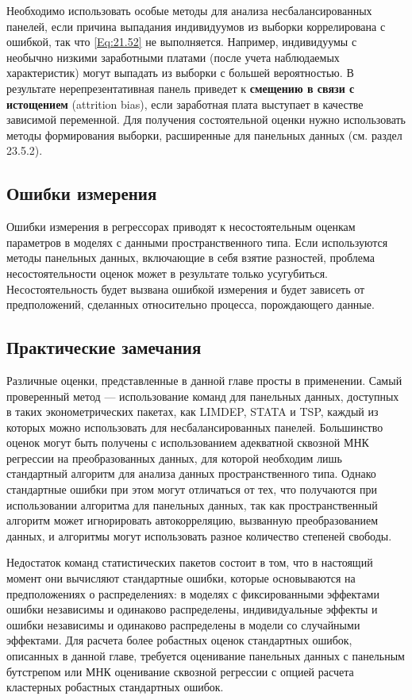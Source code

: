 Необходимо использовать особые методы для анализа несбалансированных панелей, если причина выпадания индивидуумов из выборки коррелирована с ошибкой, так что \ref{Eq:21.52} не выполняется. Например, индивидуумы с необычно низкими заработными платами (после учета наблюдаемых характеристик) могут выпадать из выборки с большей вероятностью. В результате нерепрезентативная панель приведет к \textbf{смещению в связи с истощением} (attrition bias), если заработная плата выступает в качестве зависимой переменной. Для получения состоятельной оценки нужно использовать методы формирования выборки, расширенные для панельных данных (см. раздел 23.5.2).

\subsection{Ошибки измерения}

Ошибки измерения в регрессорах приводят к несостоятельным оценкам параметров в моделях с данными пространственного типа. Если используются методы панельных данных, включающие в себя взятие разностей, проблема несостоятельности оценок может в результате только усугубиться.  Несостоятельность будет  вызвана ошибкой измерения и будет зависеть от предположений, сделанных относительно процесса, порождающего данные.

\subsection{Практические замечания}

Различные оценки, представленные в данной главе просты в применении. Самый проверенный метод --- использование команд для панельных данных, доступных в таких эконометрических пакетах, как LIMDEP, STATA и TSP, каждый из которых можно использовать для  несбалансированных панелей. Большинство оценок могут быть получены с использованием адекватной сквозной МНК регрессии на преобразованных данных, для которой необходим лишь стандартный алгоритм для анализа данных пространственного типа. Однако стандартные ошибки при этом могут отличаться от тех, что получаются при использовании алгоритма для панельных данных, так как пространственный алгоритм может игнорировать автокорреляцию, вызванную преобразованием данных, и алгоритмы могут использовать разное количество степеней свободы.

Недостаток команд статистических пакетов состоит в том, что в настоящий момент они вычисляют стандартные ошибки, которые основываются на  предположениях о распределениях: в моделях с фиксированными эффектами ошибки независимы и одинаково распределены,  индивидуальные эффекты и ошибки независимы и одинаково распределены в модели со случайными эффектами. Для расчета более робастных оценок стандартных ошибок, описанных в данной главе, требуется оценивание панельных данных с панельным бутстрепом или МНК оценивание сквозной регрессии с опцией расчета кластерных робастных стандартных ошибок.

